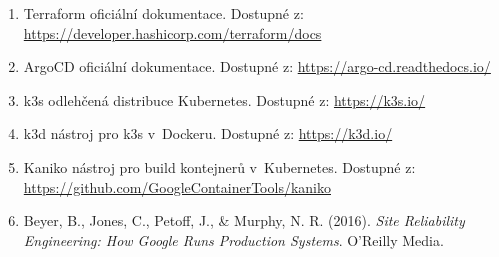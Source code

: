 \documentclass[11pt, a4paper, oneside]{article}
\begin{document}
\begin{enumerate}
    \item Terraform oficiální dokumentace. Dostupné z: \url{https://developer.hashicorp.com/terraform/docs}
    \item ArgoCD oficiální dokumentace. Dostupné z: \url{https://argo-cd.readthedocs.io/}
    \item k3s odlehčená distribuce Kubernetes. Dostupné z: \url{https://k3s.io/}
    \item k3d nástroj pro k3s v~Dockeru. Dostupné z: \url{https://k3d.io/}
    \item Kaniko nástroj pro build kontejnerů v~Kubernetes. Dostupné z: \url{https://github.com/GoogleContainerTools/kaniko}
    \item Beyer, B., Jones, C., Petoff, J., \& Murphy, N. R. (2016). \textit{Site Reliability Engineering: How Google Runs Production Systems}. O'Reilly Media.
\end{enumerate}
\end{document}
